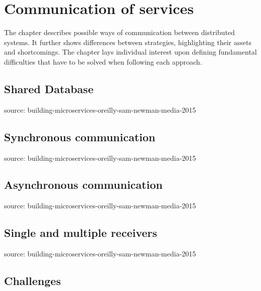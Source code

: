 \chapter{Communication of services}
\label{cha:communication}

The chapter describes possible ways of communication between distributed systems. It further shows differences between strategies, highlighting their assets and shortcomings. The chapter lays individual interest upon defining fundamental difficulties that have to be solved when following each approach. 
\section{Shared Database}
\label{sec:sharedDatabase}

source: building-microservices-oreilly-sam-newman-media-2015 
\section{Synchronous communication}
\label{sec:syncComm}

source: building-microservices-oreilly-sam-newman-media-2015 

\section{Asynchronous communication}
\label{sec:asyncComm}

source: building-microservices-oreilly-sam-newman-media-2015 

\section{Single and multiple receivers}
\label{sec:receivers}

source: building-microservices-oreilly-sam-newman-media-2015 

\section{Challenges}
\label{sec:challenges}

